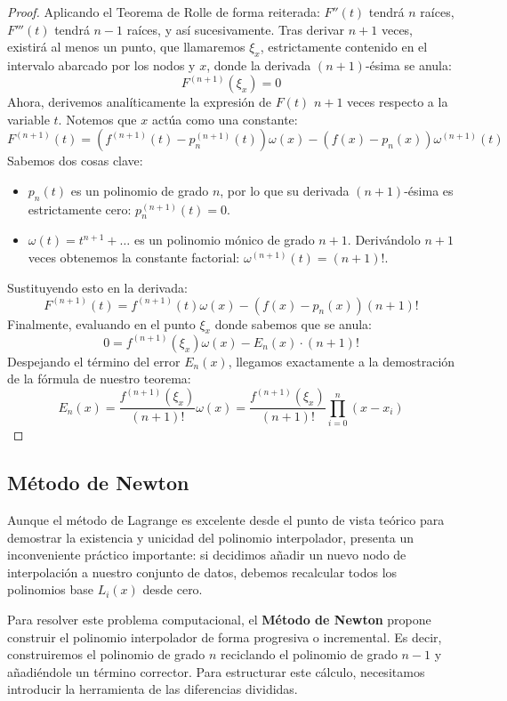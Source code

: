 \begin{proof}
    Aplicando el Teorema de Rolle de forma reiterada: $F''(t)$ tendrá $n$ raíces, $F'''(t)$ tendrá $n-1$ raíces, y así sucesivamente. Tras derivar $n+1$ veces, existirá al menos un punto, que llamaremos $\xi_x$, estrictamente contenido en el intervalo abarcado por los nodos y $x$, donde la derivada $(n+1)$-ésima se anula:
    \[        
        F^{(n+1)}(\xi_x) = 0 
    \]
    Ahora, derivemos analíticamente la expresión de $F(t)$ $n+1$ veces respecto a la variable $t$. Notemos que $x$ actúa como una constante:
    \[
        F^{(n+1)}(t) = \left( f^{(n+1)}(t) - p_n^{(n+1)}(t) \right) \omega(x) - \left( f(x) - p_n(x) \right) \omega^{(n+1)}(t)
    \]
    Sabemos dos cosas clave:
    \begin{itemize}
        \item $p_n(t)$ es un polinomio de grado $n$, por lo que su derivada $(n+1)$-ésima es estrictamente cero: $p_n^{(n+1)}(t) = 0$.
        \item $\omega(t) = t^{n+1} + \dots$ es un polinomio mónico de grado $n+1$. Derivándolo $n+1$ veces obtenemos la constante factorial: $\omega^{(n+1)}(t) = (n+1)!$.
    \end{itemize}
    Sustituyendo esto en la derivada:
    \[
        F^{(n+1)}(t) = f^{(n+1)}(t) \omega(x) - \left( f(x) - p_n(x) \right) (n+1)!
    \]
    Finalmente, evaluando en el punto $\xi_x$ donde sabemos que se anula:
    \[
        0 = f^{(n+1)}(\xi_x) \omega(x) - E_n(x) \cdot (n+1)!
    \]
    Despejando el término del error $E_n(x)$, llegamos exactamente a la demostración de la fórmula de nuestro teorema:
    \[
        E_n(x) = \frac{f^{(n+1)}(\xi_x)}{(n+1)!} \omega(x) = \frac{f^{(n+1)}(\xi_x)}{(n+1)!} \prod_{i=0}^n (x - x_i)
    \]
\end{proof}
\subsection{Método de Newton}

Aunque el método de Lagrange es excelente desde el punto de vista teórico para demostrar la existencia y unicidad del polinomio interpolador, presenta un inconveniente práctico importante: si decidimos añadir un nuevo nodo de interpolación a nuestro conjunto de datos, debemos recalcular todos los polinomios base $L_i(x)$ desde cero. 

Para resolver este problema computacional, el \textbf{Método de Newton} propone construir el polinomio interpolador de forma progresiva o incremental. Es decir, construiremos el polinomio de grado $n$ reciclando el polinomio de grado $n-1$ y añadiéndole un término corrector. Para estructurar este cálculo, necesitamos introducir la herramienta de las diferencias divididas.

